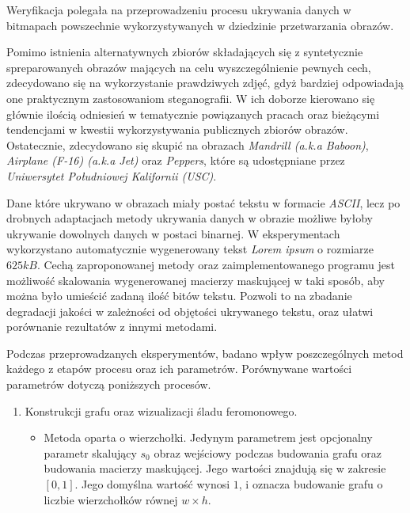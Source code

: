 {    %
    Weryfikacja polegała na przeprowadzeniu procesu ukrywania danych w bitmapach powszechnie wykorzystywanych w
    dziedzinie przetwarzania obrazów.

    Pomimo istnienia alternatywnych zbiorów składających się z syntetycznie
    spreparowanych obrazów mających na celu wyszczególnienie pewnych cech\cite{Uhlmann2018ACI}, zdecydowano się na
    wykorzystanie prawdziwych zdjęć, gdyż bardziej odpowiadają one praktycznym zastosowaniom steganografii. W ich
    doborze kierowano się głównie ilością odniesień w tematycznie powiązanych pracach oraz bieżącymi tendencjami w
    kwestii wykorzystywania publicznych zbiorów obrazów\cite{NoteOnLena1, NoteOnLena2}. Ostatecznie, zdecydowano się
    skupić na obrazach \textit{Mandrill (a.k.a Baboon)}, \textit{Airplane (F-16) (a.k.a Jet)} oraz \textit{Peppers},
    które są udostępniane przez \textit{Uniwersytet Południowej Kalifornii (USC)}\cite{USCDatabase}.

    Dane które ukrywano w obrazach miały postać tekstu w formacie \textit{ASCII}, lecz po drobnych adaptacjach metody
    ukrywania danych w obrazie możliwe byłoby ukrywanie dowolnych danych w postaci binarnej. W eksperymentach
    wykorzystano automatycznie wygenerowany tekst \textit{Lorem ipsum} o rozmiarze $625kB$. Cechą zaproponowanej metody
    oraz zaimplementowanego programu jest możliwość skalowania wygenerowanej macierzy maskującej w taki sposób, aby
    można było umieścić zadaną ilość bitów tekstu. Pozwoli to na zbadanie degradacji jakości w zależności od objętości
    ukrywanego tekstu, oraz ułatwi porównanie rezultatów z innymi metodami.

    Podczas przeprowadzanych eksperymentów, badano wpływ poszczególnych metod każdego z etapów procesu oraz ich
    parametrów. Porównywane wartości parametrów dotyczą poniższych procesów.

    \begin{enumerate}
        \item Konstrukcji grafu oraz wizualizacji śladu feromonowego.
        \begin{itemize}
            \item Metoda oparta o wierzchołki. Jedynym parametrem jest opcjonalny parametr skalujący $s_0$ obraz
            wejściowy podczas budowania grafu oraz budowania macierzy maskującej. Jego wartości znajdują się w zakresie
            $[0, 1]$. Jego domyślna wartość wynosi $1$, i oznacza budowanie grafu o liczbie wierzchołków równej $w
            \times h$.


\end{itemize}
\end{enumerate}}

